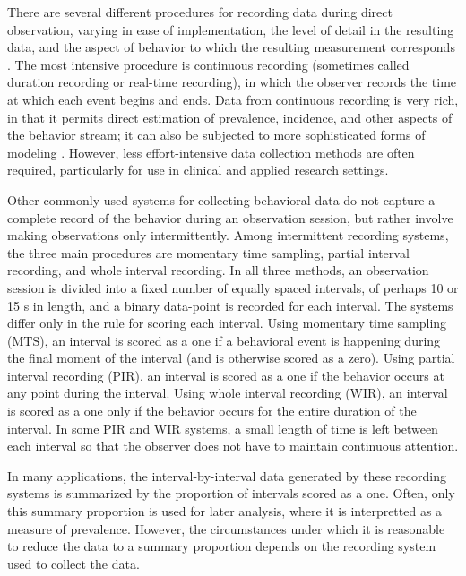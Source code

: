 \documentclass[man, noextraspace, floatsintext]{apa6}\usepackage[]{graphicx}\usepackage[]{color}
\begin{document}
There are several different procedures for recording data during direct observation, varying in ease of implementation, the level of detail in the resulting data, and the aspect of behavior to which the resulting measurement corresponds \citep[for surveys of major recording procedures, see][]{Altmann1974observational, Ayres2010dependent, Hartmann1990observational, Primavera1996measurement}. 
The most intensive procedure is continuous recording (sometimes called duration recording or real-time recording), in which the observer records the time at which each event begins and ends.
Data from continuous recording is very rich, in that it permits direct estimation of prevalence, incidence, and other aspects of the behavior stream; it can also be subjected to more sophisticated forms of modeling \citep[e.g.,][]{Bakeman2011sequential, Haccou1992statistical}. 
However, less effort-intensive data collection methods are often required, particularly for use in clinical and applied research settings. 

Other commonly used systems for collecting behavioral data do not capture a complete record of the behavior during an observation session, but rather involve making observations only intermittently. 
Among intermittent recording systems, the three main procedures are momentary time sampling, partial interval recording, and whole interval recording. 
In all three methods, an observation session is divided into a fixed number of equally spaced intervals, of perhaps 10 or 15 s in length, and a binary data-point is recorded for each interval. 
The systems differ only in the rule for scoring each interval. 
Using momentary time sampling (MTS), an interval is scored as a one if a behavioral event is happening during the final moment of the interval (and is otherwise scored as a zero). 
Using partial interval recording (PIR), an interval is scored as a one if the behavior occurs at any point during the interval. 
Using whole interval recording (WIR), an interval is scored as a one only if the behavior occurs for the entire duration of the interval. 
In some PIR and WIR systems, a small length of time is left between each interval so that the observer does not have to maintain continuous attention. 

In many applications, the interval-by-interval data generated by these recording systems is summarized by the proportion of intervals scored as a one. 
Often, only this summary proportion is used for later analysis, where it is interpretted as a measure of prevalence. 
However, the circumstances under which it is reasonable to reduce the data to a summary proportion depends on the recording system used to collect the data. 
\end{document}
